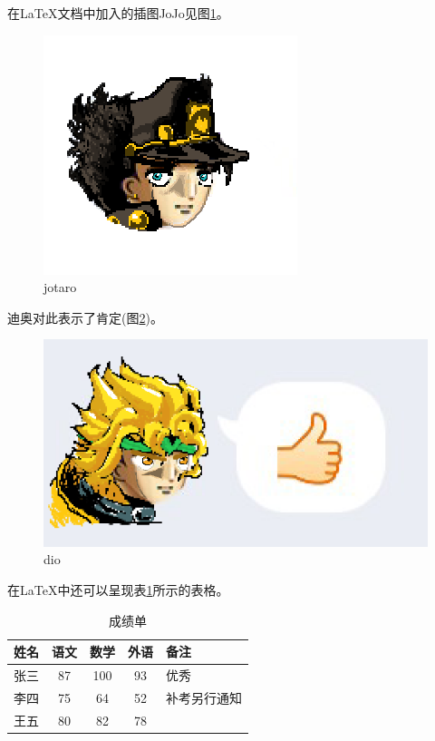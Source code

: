 \documentclass{ctexart}
\begin{document}
	在\LaTeX{}文档中加入的插图JoJo见图\ref{fig-jojo}。%
	
	\begin{figure}[htbp]
		\centering%
		\includegraphics{Jotaro}
		\caption{jotaro}%
		\label{fig-jojo}%
	\end{figure}

	迪奥对此表示了肯定(图\ref{fig-dio})。
	\begin{figure}[htbp]
		\centering
		\includegraphics{dio}
		\caption{dio}\label{fig-dio}
	\end{figure}
	
	在\LaTeX 中还可以呈现表\ref{tab-score}所示的表格。
	\begin{table}[h]
		\centering
		\caption{成绩单}\label{tab-score}
		\begin{tabular}{l || c | c | c | p{1.5cm}}%
			\hline%
			姓名 & 语文 & 数学 & 外语 & 备注 \\
			\hline\hline%
			张三 & 87 & 100 & 93 & 优秀 \\
			\hline
			李四 & 75 & 64 & 52 & 补考另行通知 \\
			\hline
			王五 & 80 & 82 & 78 & \\
			\hline
		\end{tabular}
	\end{table}
	
\end{document}
